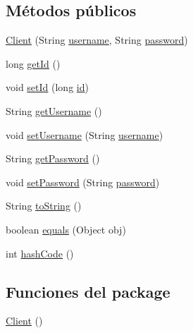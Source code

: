 \subsection*{Métodos públicos}
\begin{DoxyCompactItemize}
\item 
\mbox{\hyperlink{classcom_1_1ruralhousejsf_1_1domain_1_1_client_a57bf8892cfbb684bcda11d6bb786871b}{Client}} (String \mbox{\hyperlink{classcom_1_1ruralhousejsf_1_1domain_1_1_client_a0d105bbb8e72c4a5b70ec43f59227882}{username}}, String \mbox{\hyperlink{classcom_1_1ruralhousejsf_1_1domain_1_1_client_a1914bdf0282fd4a34b890a6fb775619e}{password}})
\item 
long \mbox{\hyperlink{classcom_1_1ruralhousejsf_1_1domain_1_1_client_a522bbbbe3b397983a76056b4350126df}{get\+Id}} ()
\item 
void \mbox{\hyperlink{classcom_1_1ruralhousejsf_1_1domain_1_1_client_a0e4914e375b61e50427b5fbd15c0948f}{set\+Id}} (long \mbox{\hyperlink{classcom_1_1ruralhousejsf_1_1domain_1_1_client_ab353a203ee0d84148e34fbb27ff0dbb8}{id}})
\item 
String \mbox{\hyperlink{classcom_1_1ruralhousejsf_1_1domain_1_1_client_a0ae33acded961afcf93152d917bf1aa1}{get\+Username}} ()
\item 
void \mbox{\hyperlink{classcom_1_1ruralhousejsf_1_1domain_1_1_client_acf233b95ed06204b7724cc7d277352ab}{set\+Username}} (String \mbox{\hyperlink{classcom_1_1ruralhousejsf_1_1domain_1_1_client_a0d105bbb8e72c4a5b70ec43f59227882}{username}})
\item 
String \mbox{\hyperlink{classcom_1_1ruralhousejsf_1_1domain_1_1_client_a5ecd4e7fd82dec1d7348730379be6b54}{get\+Password}} ()
\item 
void \mbox{\hyperlink{classcom_1_1ruralhousejsf_1_1domain_1_1_client_a89d703e0377510769b326334f31fbb8d}{set\+Password}} (String \mbox{\hyperlink{classcom_1_1ruralhousejsf_1_1domain_1_1_client_a1914bdf0282fd4a34b890a6fb775619e}{password}})
\item 
String \mbox{\hyperlink{classcom_1_1ruralhousejsf_1_1domain_1_1_client_a9af93d16608b629f3606f859b0ec85e9}{to\+String}} ()
\item 
boolean \mbox{\hyperlink{classcom_1_1ruralhousejsf_1_1domain_1_1_client_acf199d84c39f08cea14078ef175be9f5}{equals}} (Object obj)
\item 
int \mbox{\hyperlink{classcom_1_1ruralhousejsf_1_1domain_1_1_client_aaa86bcfe5247f3aeae9daec9600cf70c}{hash\+Code}} ()
\end{DoxyCompactItemize}
\subsection*{Funciones del \textquotesingle{}package\textquotesingle{}}
\begin{DoxyCompactItemize}
\item 
\mbox{\hyperlink{classcom_1_1ruralhousejsf_1_1domain_1_1_client_a351f5095f2aa19b4b43bd39c069d7e43}{Client}} ()
\end{DoxyCompactItemize}

